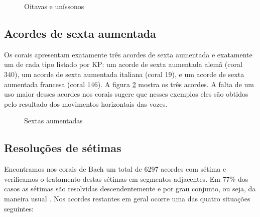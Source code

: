 \begin{figure}[!h]
  \centering
  \qquad
  \qquad
  \caption{Oitavas e uníssonos}
  \label{fig:oitavas-e-unissonos}
\end{figure}

\subsection{Acordes de sexta aumentada}
\label{sec:acordes-de-sexta}

Os corais apresentam exatamente três acordes de sexta aumentada e
exatamente um de cada tipo listado por KP: um acorde de sexta
aumentada alemã (coral 340), um acorde de sexta aumentada italiana
(coral 19), e um acorde de sexta aumentada francesa (coral 146). A
figura \ref{fig:sextas-aumentadas} mostra os três acordes. A falta de
um uso maior desses acordes nos corais sugere que nesses exemplos eles
são obtidos pelo resultado dos movimentos horizontais das vozes.

\begin{figure}[!h]
  \centering
  \caption{Sextas aumentadas}
  \label{fig:sextas-aumentadas}
\end{figure}

\subsection{Resoluções de sétimas}
\label{sec:setimas}

Encontramos nos corais de Bach um total de 6297 acordes com sétima e
verificamos o tratamento destas sétimas em segmentos adjacentes. Em
77\% dos casos as sétimas são resolvidas descendentemente e por grau
conjunto, ou seja, da maneira usual \cite[p. 207]{kostka.ea00:tonal}.
Nos acordes restantes em geral ocorre uma das quatro situações
seguintes:

